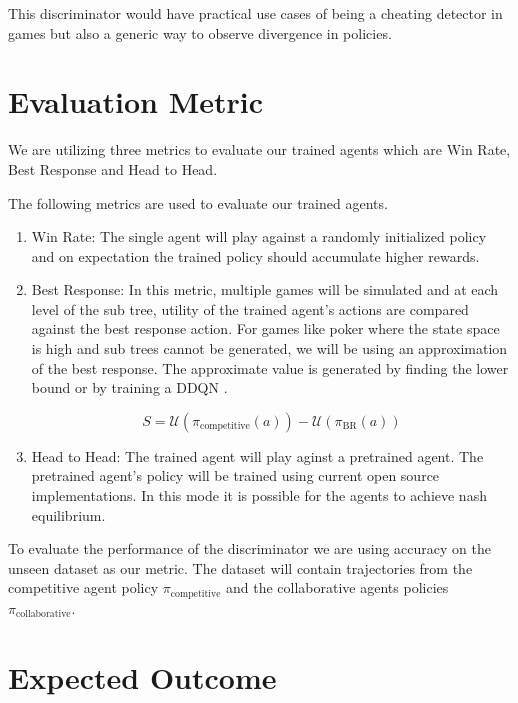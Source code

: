 \documentclass{article}
\begin{document}
This discriminator would have practical use cases of being a cheating detector in games but also a generic way to observe divergence in policies.

\section{Evaluation Metric}

We are utilizing three metrics to evaluate our trained agents which are Win Rate, Best Response and Head to Head. 

The following metrics are used to evaluate our trained agents.

\begin{enumerate}
    \item Win Rate: The single agent will play against a randomly initialized policy and on expectation the trained policy should accumulate higher rewards.

    \item Best Response: In this metric, multiple games will be simulated and at each level of the sub tree, utility of the trained agent's actions are compared against the best response action. For games like poker where the state space is high and sub trees cannot be generated, we will be using an approximation of the best response. The approximate value is generated by finding the lower bound \cite{lowerbound} or by training a DDQN \cite{br_ddqn}. 

    \begin{center}
        $$S = \mathcal{U}(\pi_{\text{competitive}}(a)) - \mathcal{U}(\pi_{\text{BR}}(a))$$
    \end{center}

    \item Head to Head: The trained agent will play aginst a pretrained agent. The pretrained agent's policy will be trained using current open source implementations. In this mode it is possible for the agents to achieve nash equilibrium.
\end{enumerate} 


To evaluate the performance of the discriminator we are using accuracy on the unseen dataset as our metric. The dataset will contain trajectories from the competitive agent policy $\pi_{\text{competitive}}$ and the collaborative agents policies $\pi_{\text{collaborative}}$.

\section{Expected Outcome}
\end{document}
